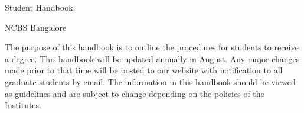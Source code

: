 \documentclass[a4paper]{article}
\begin{document}
\thispagestyle{empty}

\begin{minipage}{0.4\textwidth}
    \hfill
\end{minipage} %
\begin{minipage}{0.6\textwidth}
    {\fontsize{1cm}{1.5cm}\selectfont Student Handbook}

    \vspace{2mm}
    {\raggedleft \Large NCBS Bangalore}

    \vspace{15cm} The purpose of this handbook is to outline the
    procedures for students to receive a degree. This handbook will be updated
    annually in August.  Any major changes made prior to that time will be
    posted to our website with notification to all graduate students by email.
    The information in this handbook should be viewed as guidelines and are
subject to change depending on the policies of the Institutes.  \end{minipage}
\end{document}
